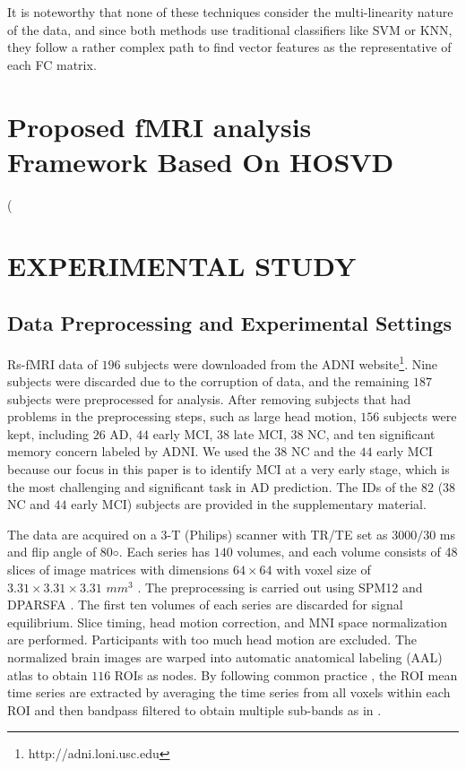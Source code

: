\documentclass[preprint,12pt]{elsarticle}
\begin{document}
	It is noteworthy that none of these techniques consider the multi-linearity nature of the data, and since both methods use traditional classifiers like SVM or KNN, they follow a rather complex path to find vector features as the representative of each FC matrix.
	
	
	
	
	\section{Proposed fMRI analysis Framework Based On HOSVD}
	
	\left( 
	
	\section{EXPERIMENTAL STUDY}
	\subsection{Data Preprocessing and Experimental Settings}
	
	Rs-fMRI data of $196$ subjects were downloaded from the ADNI website\footnote{http://adni.loni.usc.edu}. Nine subjects were discarded
	due to the corruption of data, and the remaining $187$ subjects were preprocessed for analysis. After removing subjects that had problems in the preprocessing steps, such as large head motion,
	$156$ subjects were kept, including $26$ AD, $44$ early MCI, $38$ late MCI, $38$ NC, and ten significant memory concern labeled by ADNI. We used the $38$ NC and the $44$ early MCI because our focus in this paper is to identify MCI at a very early stage, which is the most challenging and significant task in AD
	prediction. The IDs of the $82$ ($38$ NC and $44$ early MCI) subjects are provided in the supplementary material. 
	
	The data are acquired on a $3$-T (Philips) scanner with TR/TE set as $3000/30$
	ms and flip angle of $80◦$. Each series has $140$ volumes, and each volume consists of 48 slices of image matrices with dimensions
	$64 \times 64$
	with voxel size of
	$ 3.31 \times  3.31 \times 3.31$
	$mm^3$ . The preprocessing is carried out using SPM12 and DPARSFA \cite{r64.5}. The
	first ten volumes of each series are discarded for signal equilibrium. Slice timing, head motion correction, and MNI space normalization are performed. Participants with too much head motion are excluded. The normalized brain images are warped into automatic anatomical labeling (AAL) \cite{r64.7} atlas to obtain $116$ ROIs as nodes. By following common practice \cite{n1, n2, n3}, the ROI mean time series are extracted by averaging the time series from all voxels within each ROI and then bandpass filtered to obtain multiple sub-bands as in \cite{n3}. 
	
\end{document}
